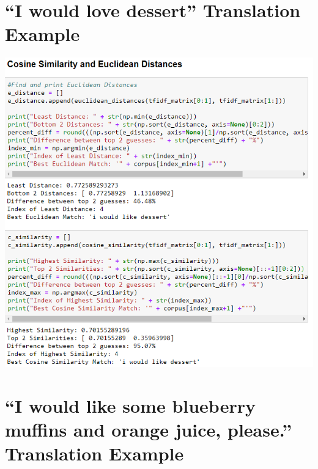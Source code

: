\documentclass[runningheads]{llncs}
\begin{document}
\section{``I would love dessert'' Translation Example}
\hypertarget{Appendix E}{}

	\begin{minipage}{\linewidth}
		\begin{center}
			\includegraphics[width=\linewidth]{Dessert_Comparison.png}
			\label{fig:Sentence Comparison 2}
			\vspace*{1cm}
		\end{center}
	\end{minipage}
	\afterpage{\clearpage}


\section{``I would like some blueberry muffins and orange juice, please.'' Translation Example}
\hypertarget{Appendix F}{}
\end{document}

